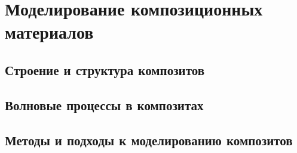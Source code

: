 \section{Моделирование композиционных материалов}

\subsection{Строение и структура композитов}

\subsection{Волновые процессы в композитах}

\subsection{Методы и подходы к моделированию композитов}

